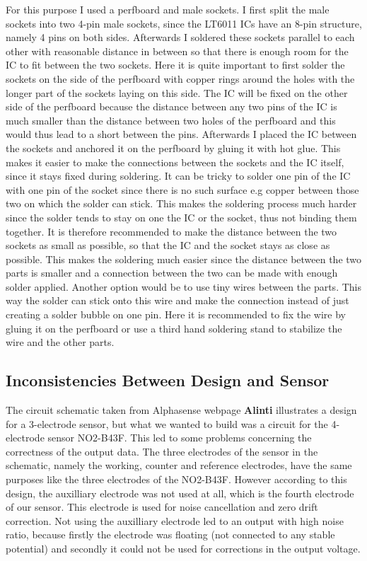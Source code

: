 For this purpose I used a perfboard and male sockets. I first split the male sockets into two 4-pin male sockets, since the LT6011 ICs have an 8-pin structure, namely 4 pins on both sides. Afterwards I soldered these sockets parallel to each other with reasonable distance in between so that there is enough room for the IC to fit between the two sockets. Here it is quite important to first solder the sockets on the side of the perfboard with copper rings around the holes with the longer part of the sockets laying on this side. The IC will be fixed on the other side of the perfboard because the distance between any two pins of the IC is much smaller than the distance between two holes of the perfboard and this would thus lead to a short between the pins. Afterwards I placed the IC between the sockets and anchored it on the perfboard by gluing it with hot glue. This makes it easier to make the connections between the sockets and the IC itself, since it stays fixed during soldering. It can be tricky to solder one pin of the IC with one pin of the socket since there is no such surface e.g copper between those two on which the solder can stick. This makes the soldering process much harder since the solder tends to stay on one the IC or the socket, thus not binding them together. It is therefore recommended to make the distance between the two sockets as small as possible, so that the IC and the socket stays as close as possible. This makes the soldering much easier since the distance between the two parts is smaller and a connection between the two can be made with enough solder applied. Another option would be to use tiny wires between the parts. This way the solder can stick onto this wire and make the connection instead of just creating a solder bubble on one pin. Here it is recommended to fix the wire by gluing it on the perfboard or use a third hand soldering stand to stabilize the wire and the other parts.

\subsection{Inconsistencies Between Design and Sensor}

The circuit schematic taken from Alphasense webpage \textbf{Alinti} illustrates a design for a 3-electrode sensor, but what we wanted to build was a circuit for the 4-electrode sensor NO2-B43F. This led to some problems concerning the correctness of the output data. The three electrodes of the sensor in the schematic, namely the working, counter and reference electrodes, have the same purposes like the three electrodes of the NO2-B43F. However according to this design, the auxilliary electrode was not used at all, which is the fourth electrode of our sensor. This electrode is used for noise cancellation and zero drift correction. Not using the auxilliary electrode led to an output with high noise ratio, because firstly the electrode was floating (not connected to any stable potential) and secondly it could not be used for corrections in the output voltage. 


